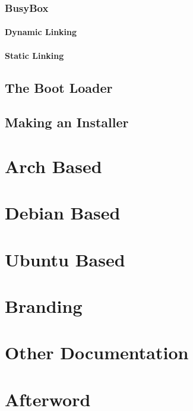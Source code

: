 \documentclass{article}
\begin{document}
		\subsubsection{BusyBox}
		\paragraph{Dynamic Linking}
		\paragraph{Static Linking}
		\subsection{The Boot Loader}
		\subsection{Making an Installer}
\section{Arch Based}
\section{Debian Based}
\section{Ubuntu Based}
\section{Branding}
\section{Other Documentation}
\section{Afterword}
\end{document}
